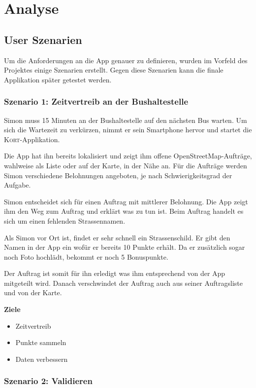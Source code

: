 \section{Analyse}

\subsection{User Szenarien}

Um die Anforderungen an die App genauer zu definieren, wurden im Vorfeld des Projektes einige Szenarien erstellt.
Gegen diese Szenarien kann die finale Applikation später getestet werden.

\subsubsection{Szenario 1: Zeitvertreib an der Bushaltestelle}

Simon muss 15 Minuten an der Bushaltestelle auf den nächsten Bus warten.
Um sich die Wartezeit zu verkürzen, nimmt er sein Smartphone hervor und startet die \textsc{Kort}-Applikation.

Die App hat ihn bereits lokalisiert und zeigt ihm offene OpenStreetMap-Aufträge, wahlweise als Liste oder auf der Karte, in der Nähe an.
Für die Aufträge werden Simon verschiedene Belohnungen angeboten, je nach Schwierigkeitsgrad der Aufgabe.

Simon entscheidet sich für einen Auftrag mit mittlerer Belohnung.
Die App zeigt ihm den Weg zum Auftrag und erklärt was zu tun ist. Beim Auftrag handelt es sich um einen fehlenden Strassennamen.

Als Simon vor Ort ist, findet er sehr schnell ein Strassenschild.
Er gibt den Namen in der App ein wofür er bereits 10 Punkte erhält.
Da er zusätzlich sogar noch Foto hochlädt, bekommt er noch 5 Bonuspunkte.

Der Auftrag ist somit für ihn erledigt was ihm entsprechend von der App mitgeteilt wird.
Danach verschwindet der Auftrag auch aus seiner Auftragsliste und von der Karte.

\textbf{Ziele}
\begin{itemize}
\item Zeitvertreib
\item Punkte sammeln
\item Daten verbessern
\end{itemize}

\subsubsection{Szenario 2: Validieren}

